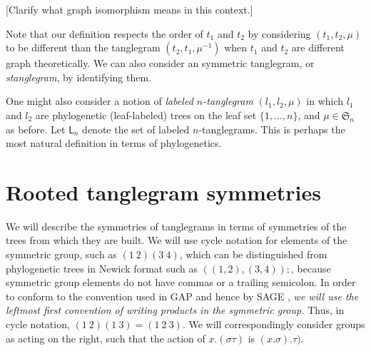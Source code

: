 \documentclass{amsart}
\newcommand{\fS}{\mathfrak S}
\newcommand{\pairing}{\mu}
\newcommand{\ltangle}{\mathsf{L}}
\begin{document}
[Clarify what graph isomorphism means in this context.]

Note that our definition respects the order of $t_1$ and $t_2$ by considering $(t_1, t_2, \pairing)$ to be different than the tanglegram $(t_2, t_1, \pairing^{-1})$ when $t_1$ and $t_2$ are different graph theoretically.
We can also consider an symmetric tanglegram, or \emph{stanglegram}, by identifying them.

One might also consider a notion of \emph{labeled $n$-tanglegram} $(l_1, l_2, \pairing)$ in which $l_1$ and $l_2$ are phylogenetic (leaf-labeled) trees on the leaf set $\{1, \ldots, n\}$, and $\pairing \in \fS_n$ as before.
Let $\ltangle_n$ denote the set of labeled $n$-tanglegrams.
This is perhaps the most natural definition in terms of phylogenetics.


\section{Rooted tanglegram symmetries}
We will describe the symmetries of tanglegrams in terms of symmetries of the trees from which they are built.
We will use cycle notation for elements of the symmetric group, such as $(1\ 2) (3\ 4)$, which can be distinguished from phylogenetic trees in Newick format \cite{wiki:newick} such as $((1,2),(3,4));$, because symmetric group elements do not have commas or a trailing semicolon.
In order to conform to the convention used in GAP \cite{GAP4} and hence by SAGE \cite{SteinJoyner2005}, \emph{we will use the leftmost first convention of writing products in the symmetric group.}
Thus, in cycle notation, $(1\ 2) (1\ 3) = (1\ 2\ 3)$.
We will correspondingly consider groups as acting on the right, such that the action of $x.(\sigma \tau)$ is $(x.\sigma) . \tau)$.
\end{document}
